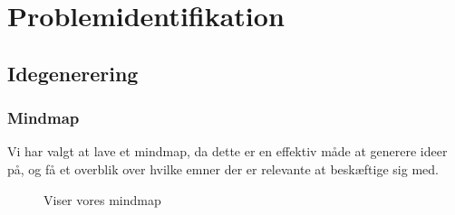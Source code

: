 \section{Problemidentifikation}
\subsection{Idegenerering}
\subsubsection{Mindmap}
Vi har valgt at lave et mindmap, da dette er en effektiv måde at generere ideer på, og få et overblik over hvilke emner der er relevante at beskæftige sig med.
\begin{figure}[H]
    \centering
    \caption{Viser vores mindmap}
\end{figure}

